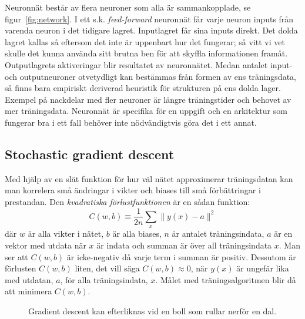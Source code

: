 Neuronnät består av flera neuroner som alla är sammankopplade, se figur~\ref{fig:network}.
I ett s.k. \textit{feed-forward} neuronnät får varje neuron inputs från
varenda neuron i det tidigare lagret.
Inputlagret får sina inputs direkt.
Det dolda lagret kallas så eftersom det inte är uppenbart hur det fungerar;
så vitt vi vet skulle det kunna använda sitt brutna ben
för att skyffla informationen framåt.
Outputlagrets aktiveringar blir resultatet av neuronnätet.
Medan antalet input- och outputneuroner otvetydligt kan bestämmas
från formen av ens träningsdata,
så finns bara empiriskt deriverad heuristik för strukturen på ens dolda lager.
Exempel på nackdelar med fler neuroner är längre träningstider
och behovet av mer träningsdata.
Neuronnät är specifika för en uppgift och en arkitektur som
fungerar bra i ett fall behöver inte nödvändigtvis göra det i ett annat.
\autocite{nielsen15}

\subsection{Stochastic gradient descent}
\label{sec:sdg}
Med hjälp av en slät funktion för hur väl nätet approximerar träningsdatan
kan man korrelera små ändringar i vikter och biases
till små förbättringar i prestandan.
Den \emph{kvadratiska förlustfunktionen} är en sådan funktion:
\begin{equation} \label{eq:cost}
	C(w, b) \equiv \frac{1}{2n} \displaystyle\sum_x \lVert y(x) - a \rVert^2
\end{equation}
där $ w $ är alla vikter i nätet, $ b $ är alla biases,
$ n $ är antalet träningsindata, $ a $ är en vektor med utdata när $ x $ är indata
och summan är över all träningsindata $ x $.
Man ser att $ C(w, b) $ är icke-negativ då varje term i summan är positiv.
Dessutom är förlusten $ C(w, b) $ liten, det vill säga $ C(w, b) \approx 0 $,
när $ y(x) $ är ungefär lika med utdatan, $ a $, för alla träningsindata, $ x $.
Målet med träningsalgoritmen blir då att minimera $ C(w, b) $.

\begin{figure}
	\centering
	\caption{Gradient descent kan efterliknas vid en boll som rullar nerför en dal.}
	\label{fig:descent}
\end{figure}

